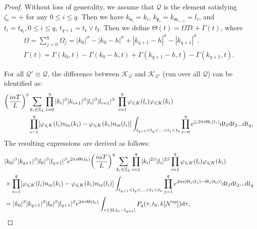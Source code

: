 \documentclass[UTF-8,reqno]{amsart}
\numberwithin{equation}{section}
\theoremstyle{definition}
\def\dif{{\mathord{{\rm d}}}}
\def\leq{\leqslant}
\def\dif{{\mathord{{\rm d}}}}
\def\leq{\leqslant}
\begin{document}
\begin{proof}
Without loss of generality, we assume that $\mathcal{Q}$ is the element satisfying  $\zeta_{i}=+$ for any  $0\leq i\leq q$. Then we have $k_{\mathfrak n_i} = k_i$, $k_{\mathfrak p_i} = k_{\mathfrak m_{i-1}} = l_i$, and $t_i = t_{\mathfrak n_i},0\leq i\leq q$,  $t_{q+1} = t_{\mathfrak e}\vee t_{\mathfrak f} $.  
  Then we define $\Theta(t)=\Omega Tt+\Gamma(t)$, where 
    \begin{align*}
    \Omega = \sum_{j = 0}^q \Omega_{j} = |k_{0}|^\sigma- |k_{0} -h|^\sigma + |k_{q+1}- h|^\sigma-|k_{q+1}|^\sigma.\\
   \Gamma(t)=\Gamma(k_0,t)- \Gamma(k_0 -h,t)+ \Gamma(k_{q+1}- h,t)- \Gamma(k_{q+1},t).
    \end{align*}
   
    For all $\mathcal Q'\equiv \mathcal{Q}$, the difference between  $\mathcal K_{\mathcal Q}$ and $\mathcal K_{\mathcal Q'}$ (run over all $\mathcal{Q}$) can be identified as:
 \begin{align*}
    \bigg(\frac{i\alpha T}{L}\bigg)^q&\sum\limits_{k_i \in \mathbb{Z}_L}  %
    \prod_{i=0}^q |k_i|^\beta|k_{i+1}|^\beta|l_i|^\beta|l_{i+1}|^\beta\ \prod_{i=1}^q \varphi_{\leq K}({l_i})\varphi_{\leq K}({k_i})\notag\\ 
    &\prod_{i = 1}^q [\varphi_{\leq K}(l_i)n_{\rm in}(k_i)-\varphi_{\leq K}(k_i)n_{\rm in}(l_i)]
\int_{t_{q+1} < t_q < \ldots < t_1 < t_0}\prod_{i=0}^q  e^{\zeta_{i}2\pi i\Theta_i(t_i) } \dif t_1\dif t_2...\dif t_q,
 \end{align*}
    The resulting expressions are derived as follows:
    \begin{align*} 
    & %
    |k_0|^\beta|k_{q+1}|^\beta|l_0|^\beta|l_{q+1}|^\beta e^{ 2\pi i \Theta(t_0)} \bigg(\frac{i\alpha T}{L}\bigg)^q\sum\limits_{k_i \in \mathbb{Z}_L}%
    \prod_{i=1}^q |k_i|^{2\beta}|l_i|^{2\beta}\prod_{i=1}^q \varphi_{\leq K}({l_i})\varphi_{\leq K}({k_i}) \\
     &\times\prod_{i = 1}^q [\varphi_{\leq K}(l_i)n_{\rm in}(k_i)-\varphi_{\leq K}(k_i)n_{\rm in}(l_i)]
\int_{t_{q+1} < t_q < \ldots < t_1 < t_0} \prod_{j = 1}^q e^{2\pi i( \Theta_{j}(t_{j})-\Theta_j(t_{0}))} \dif t_1\dif t_2...\dif t_q\\
    & = %
    |k_0|^\beta|k_{q+1}|^\beta|l_0|^\beta|l_{q+1}|^\beta e^{ 2\pi i \Theta(t_0)}  \int_{\tau\in [0,t_0-t_{q+1}]}P_q(\tau, t_0, k[\mathcal N^{sp}]) \dif \tau,
    \end{align*}

\end{proof}
\end{document}
